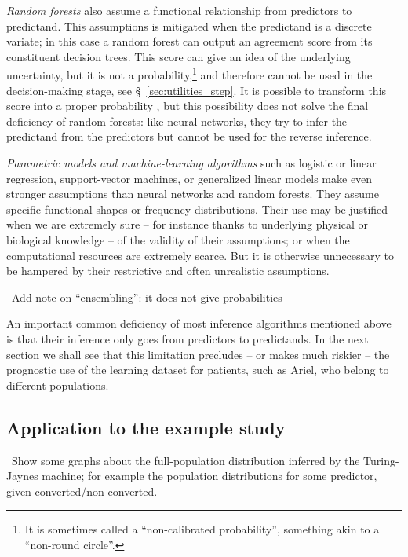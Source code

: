 \documentclass[utf8]{FrontiersinHarvard} %
\newcommand*{\pencil}{{\fontencoding{U}\fontfamily{fontawesometwo}\selectfont\symbol{210}}}
\newcommand{\mynotep}[1]{{\color{notecolour}\pencil\ #1}}
\newcommand*{\sect}{\S}%
\renewcommand*{\|}[1][]{\nonscript\:#1\vert\nonscript\:\mathopen{}}
\newcommand*{\tjm}{Turing-Jaynes machine}
\begin{document}
\emph{Random forests} also assume a functional relationship from predictors to predictand. This assumptions is mitigated when the predictand is a discrete variate; in this case a random forest can output an agreement score from its constituent decision trees. This score can give an idea of the underlying uncertainty, but it is not a probability,\footnote{It is sometimes called a \enquote{non-calibrated probability}, something akin to a \enquote{non-round circle}.} and therefore cannot be used in the decision-making stage, see \sect~\ref{sec:utilities_step}. It is possible to transform this score into a proper probability \citep{dyrlandetal2022b}, but this possibility does not solve the final deficiency of random forests: like neural networks, they try to infer the predictand from the predictors but cannot be used for the reverse inference.

\emph{Parametric models and machine-learning algorithms} such as logistic or linear regression, support-vector machines, or generalized linear models make even stronger assumptions than neural networks and random forests. They assume specific functional shapes or frequency distributions. Their use may be justified when we are extremely sure -- for instance thanks to underlying physical or biological knowledge -- of the validity of their assumptions; or when the computational resources are extremely scarce. But it is otherwise unnecessary to be hampered by their restrictive and often unrealistic assumptions.

\mynotep{Add note on \enquote{ensembling}: it does not give probabilities \citep[\sect~18.2]{murphy2022}}

\medskip

An important common deficiency of most inference algorithms mentioned above is that their inference only goes from predictors to predictands. In the next section we shall see that this limitation precludes -- or makes much riskier -- the prognostic use of the learning dataset for patients, such as Ariel, who belong to different populations.

\subsection{Application to the example study}
\label{sec:learn_application}

\mynotep{Show some graphs about the full-population distribution inferred by the \tjm; for example the population distributions for some predictor, given converted/non-converted.}
\end{document}
